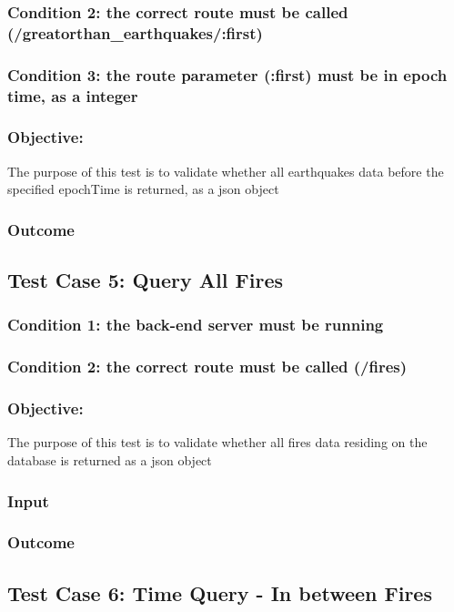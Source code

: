 \subsubsection{Condition 2: the correct route must be called (/greatorthan\_earthquakes/:first)}
\subsubsection{Condition 3: the route parameter (:first) must be in epoch time, as a integer}
\subsubsection{Objective:} The purpose of this test is to validate whether all  earthquakes data before the specified epochTime is returned, as a json object
\subsubsection{Outcome}


\subsection{Test Case 5: Query All Fires}
\subsubsection{Condition 1: the back-end server must be running}
\subsubsection{Condition 2: the correct route must be called (/fires)}
\subsubsection{Objective:} The purpose of this test is to validate whether all fires data residing on the database is returned  as a json object
\subsubsection{Input}
\subsubsection{Outcome}

\subsection{Test Case 6: Time Query - In between Fires}

